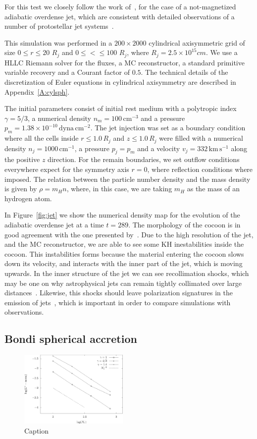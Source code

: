 For this test we closely follow the work of~\citet{stone2000}, for the case of a not-magnetized adiabatic overdense jet, which are consistent with detailed observations of a number of protostellar jet systems~\citep{nagar1997}.

This simulation was performed in a $200\times2000$ cylindrical axisymmetric grid of size $0 \leq r \leq 20$ $R_j$ and $0 \leq < \leq 100$ $R_j$, where $R_j = 2.5 \times 10^{15} cm$. We use a HLLC Riemann solver for the fluxes, a MC reconstructor, a standard primitive variable recovery and a Courant factor of $0.5$. The technical details of the discretization of Euler equations in cylindrical axisymmetry are described in Appendix~\ref{A:cylsph}.

The initial parameters consist of initial rest medium with a polytropic index $\gamma = 5/3$, a numerical density $n_m = 100 \, \mathrm{cm}^{-3}$ and a pressure $p_m = 1.38 \times 10^{-10} \, \mathrm{dyna} \, \mathrm{cm}^{-2}$. The jet injection was set as a boundary condition where all the cells inside $r \leq 1.0 \, R_j$ and $z \leq 1.0 \, R_j$ were filled with a numerical density $n_j = 1000 \, \mathrm{cm}^{-1}$, a pressure $p_j = p_m$ and a velocity $v_j = 332 \, \mathrm{km} \, \mathrm{s}^{-1}$ along the positive $z$ direction. For the remain boundaries, we set outflow conditions everywhere expect for the symmetry axis $r=0$, where reflection conditions where imposed. The relation between the particle number density and the mass density is given by $\rho = m_H n$, where, in this case, we are taking $m_H$ as the mass of an hydrogen atom.

In Figure~\ref{fig:jet} we show the numerical density map for the evolution of the adiabatic overdense jet at a time $t = 289$. The morphology of the cocoon is in good agreement with the one presented by~\citet{stone2000}. Due to the high resolution of the jet, and the MC reconstructor, we are able to see some KH inestabilities inside the cocoon. This instabilities forms because the material entering the cocoon slows down its velocity, and interacts with the inner part of the jet, which is moving upwards. In the inner structure of the jet we can see recollimation shocks, which may be one on why astrophysical jets can remain tightly collimated over large distances~\citep{kaye2018}. Likewise, this shocks should leave polarization signatures in the emission of jets~\citep{cawthorn1990}, which is important in order to compare simulations with observations.
    
\subsection{Bondi spherical accretion}
\label{subsec:bondi}

\begin{figure}
    \centering
    \includegraphics[width=0.47\textwidth]{Figures/lnorm_bondi}
    \caption{Caption}
    \label{fig:lnorm-bondi}
\end{figure}